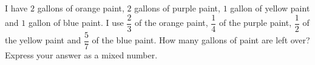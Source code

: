 I have $2$ gallons of orange paint, $2$ gallons of purple paint, $1$ gallon of yellow paint and $1$ gallon of blue paint. I use $\dfrac{2}{3}$ of the orange paint, $\dfrac{1}{4}$ of the purple paint, $\dfrac{1}{2}$ of the yellow paint and $\dfrac{5}{7}$ of the blue paint. How many gallons of paint are left over? Express your answer as a mixed number.
